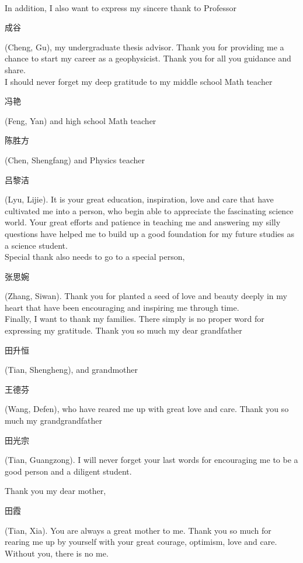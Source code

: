 \\
In addition, I also want to express my sincere thank to Professor \begin{CJK}{UTF8}{gbsn}成谷\end{CJK} (Cheng, Gu), my undergraduate thesis advisor. Thank you for providing me a chance to start my career as a geophysicist. Thank you for all you guidance and share. 
\\
I should never forget my deep gratitude to my middle school Math teacher \begin{CJK}{UTF8}{gbsn}冯艳\end{CJK} (Feng, Yan) and high school Math teacher \begin{CJK}{UTF8}{gbsn}陈胜方\end{CJK} (Chen, Shengfang) and Physics teacher \begin{CJK}{UTF8}{gbsn}吕黎洁\end{CJK} (Lyu, Lijie). It is your great education, inspiration, love and care that have cultivated me into a person, who begin able to appreciate the fascinating science world. Your great efforts and patience in teaching me and answering my silly questions have helped me to build up a good foundation for my future studies as a science student.
\\
Special thank also needs to go to a special person, \begin{CJK}{UTF8}{gbsn}张思婉\end{CJK} (Zhang, Siwan). Thank you for planted a seed of love and beauty deeply in my heart that have been encouraging and inspiring me through time.    
\\
Finally, I want to thank my families. There simply is no proper word for expressing my gratitude. Thank you so much my dear grandfather \begin{CJK}{UTF8}{gbsn}田升恒\end{CJK} (Tian, Shengheng), and grandmother \begin{CJK}{UTF8}{gbsn}王德芬\end{CJK} (Wang, Defen), who have reared me up with great love and care. Thank you so much my grandgrandfather \begin{CJK}{UTF8}{gbsn}田光宗\end{CJK} (Tian, Guangzong). I will never forget your last words for encouraging me to be a good person and a diligent student.

Thank you my dear mother, \begin{CJK}{UTF8}{gbsn}田霞\end{CJK} (Tian, Xia). You are always a great mother to me. Thank you so much for rearing me up by yourself with your great courage, optimism, love and care. Without you, there is no me.
